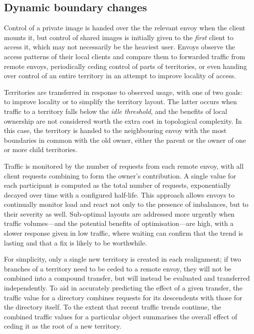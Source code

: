 \subsection{Dynamic boundary changes}

Control of a private image is handed over the the relevant envoy when the client mounts it, but control of shared images is initially given to the \emph{first} client to access it, which may not necessarily be the heaviest user. Envoys observe the access patterns of their local clients and compare them to forwarded traffic from remote envoys, periodically ceding control of parts of territories, or even handing over control of an entire territory in an attempt to improve locality of access.

Territories are transferred in response to observed usage, with one of two goals: to improve locality or to simplify the territory layout. The latter occurs when traffic to a territory falls below the \emph{idle threshold}, and the benefits of local ownership are not considered worth the extra cost in topological complexity. In this case, the territory is handed to the neighbouring envoy with the most boundaries in common with the old owner, either the parent or the owner of one or more child territories.

Traffic is monitored by the number of requests from each remote envoy, with all client requests combining to form the owner's contribution. A single value for each participant is computed as the total number of requests, exponentially decayed over time with a configured half-life. This approach allows envoys to continually monitor load and react not only to the presence of imbalances, but to their severity as well. Sub-optimal layouts are addressed more urgently when traffic volumes---and the potential benefits of optimisation---are high, with a slower response given in low traffic, where waiting can confirm that the trend is lasting and that a fix is likely to be worthwhile.

For simplicity, only a single new territory is created in each realignment; if two branches of a territory need to be ceded to a remote envoy, they will not be combined into a compound transfer, but will instead be evaluated and transferred independently. To aid in accurately predicting the effect of a given transfer, the traffic value for a directory combines requests for its descendents with those for the directory itself. To the extent that recent traffic trends continue, the combined traffic values for a particular object summarises the overall effect of ceding it as the root of a new territory.

